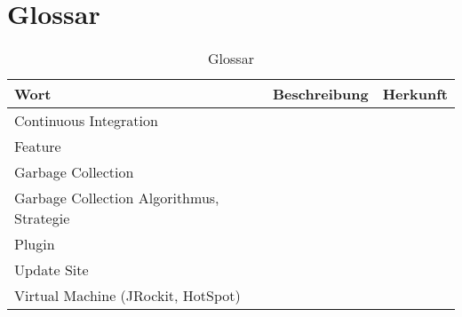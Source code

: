 \chapter*{Glossar}\label{glossar}
  \begin{longtable}{|p{5cm}|p{6cm}|p{3cm}|}
      \caption{Glossar}\\
\hline
  \textbf{Wort} & \textbf{Beschreibung} & \textbf{Herkunft}\\\hline
  Continuous Integration  &&\\\hline
  Feature && \\\hline
  Garbage Collection & & \\\hline
  Garbage Collection Algorithmus, Strategie & & \\\hline
  Plugin && \\\hline
  Update Site && \\\hline
  Virtual Machine (JRockit, HotSpot) & & \\\hline
  \end{longtable}


